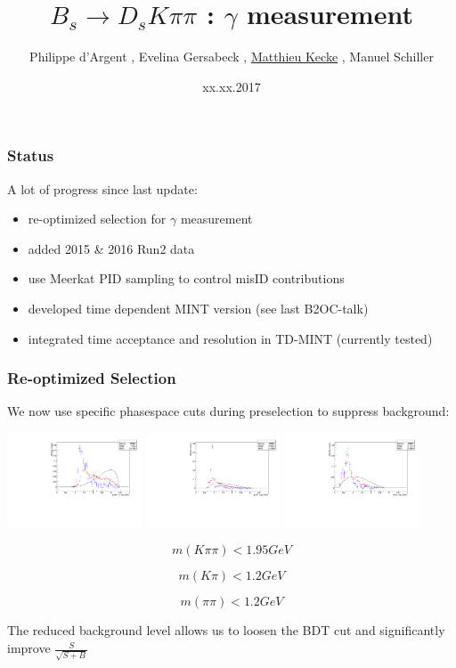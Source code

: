 \documentclass[]{beamer}
\title{$B_{s}\to D_{s}K\pi\pi$ : $\gamma$ measurement}
\author{Philippe d'Argent \inst{1}, Evelina Gersabeck \inst{1}, \underline{Matthieu Kecke} \inst{1}, Manuel Schiller \inst{2}}
\institute{\inst{1} PI Heidelberg, \inst{2} Glasgow}
\date{xx.xx.2017}
\begin{document}
\frame{\titlepage}


\begin{frame}
\frametitle{Status}

A lot of progress since last update:

\begin{itemize}

\item re-optimized selection for $\gamma$ measurement

\item added 2015 \& 2016 Run2 data 

\item use Meerkat PID sampling to control misID contributions

\item developed time dependent MINT version (see last B2OC-talk)

\item integrated time acceptance and resolution in TD-MINT (currently tested)


\end{itemize}


\end{frame}


\begin{frame}
\frametitle{Re-optimized Selection}

We now use specific phasespace cuts during preselection to suppress background:  

\includegraphics[height=!,width=0.3\textwidth]{plots/m_Kpipi.pdf}
\includegraphics[height=!,width=0.3\textwidth]{plots/m_Kpi.pdf}
\includegraphics[height=!,width=0.3\textwidth]{plots/m_pipi.pdf}

\[m(K\pi\pi) < 1.95 GeV\]

\[m(K\pi) < 1.2 GeV\]

\[m(\pi\pi) < 1.2 GeV\]

The reduced background level allows us to loosen the BDT cut and significantly improve $\frac{S}{\sqrt{S+B}}$ 


\end{frame}
\end{document}
